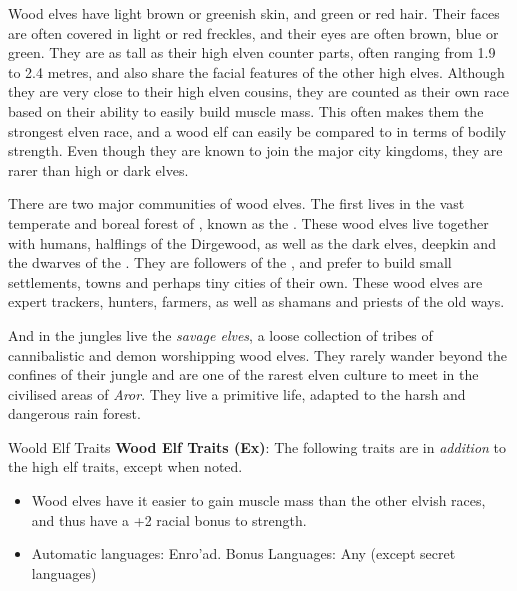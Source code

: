 Wood elves have light brown or greenish skin, and green or red hair. Their
faces are often covered in light or red freckles, and their eyes are often
brown, blue or green. They are as tall as their high elven counter parts,
often ranging from 1.9 to 2.4 metres, and also share the facial features of
the other high elves. Although they are very close to their high elven
cousins, they are counted as their own race based on their ability to easily
build muscle mass. This often makes them the strongest elven race, and a wood
elf can easily be compared to  in terms of bodily
strength. Even though they are known to join the major city kingdoms, they are
rarer than high or dark elves.

There are two major communities of wood elves. The first lives in the vast
temperate and boreal forest of , known as the
. These wood elves live together with humans, halflings
of the Dirgewood, as well as the dark elves, deepkin and the dwarves of the
. They are followers of the ,
and prefer to build small settlements, towns and perhaps tiny cities of their
own. These wood elves are expert trackers, hunters, farmers, as well as shamans
and priests of the old ways.

And in the jungles  live the \emph{savage elves}, a loose
collection of tribes of cannibalistic and demon worshipping wood elves. They
rarely wander beyond the confines of their jungle and are one of the rarest
elven culture to meet in the civilised areas of \emph{Aror}. They live a
primitive life, adapted to the harsh and dangerous rain forest.

\begin{35e}{Woold Elf Traits}
  \textbf{Wood Elf Traits (Ex)}: The following traits are in \emph{addition}
  to the high elf traits, except when noted.
  \begin{itemize}[noitemsep]
    \item Wood elves have it easier to gain muscle mass than the other elvish
      races, and thus have a +2 racial bonus to strength.
    \item Automatic languages: Enro'ad. Bonus Languages: Any (except secret
      languages)
  \end{itemize}
\end{35e}
